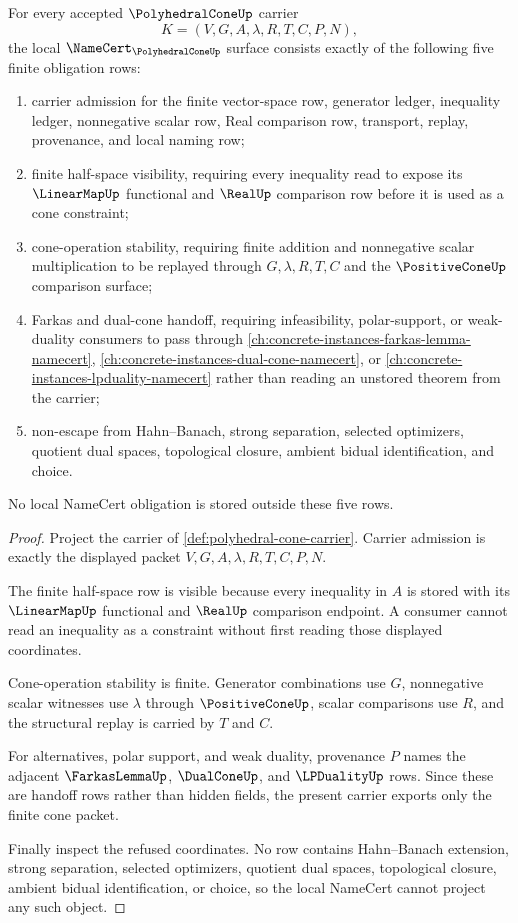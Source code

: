 \begin{theorem}
\label{thm:polyhedral-cone-namecert-obligations}
For every accepted $\PolyhedralConeUp$ carrier
$$
K=(V,G,A,\lambda,R,T,C,P,N),
$$
the local $\NameCert_{\PolyhedralConeUp}$ surface consists exactly of the following five finite obligation rows:
\begin{enumerate}
\item carrier admission for the finite vector-space row, generator ledger, inequality ledger, nonnegative scalar row, Real comparison row, transport, replay, provenance, and local naming row;
\item finite half-space visibility, requiring every inequality read to expose its $\LinearMapUp$ functional and $\RealUp$ comparison row before it is used as a cone constraint;
\item cone-operation stability, requiring finite addition and nonnegative scalar multiplication to be replayed through $G,\lambda,R,T,C$ and the $\PositiveConeUp$ comparison surface;
\item Farkas and dual-cone handoff, requiring infeasibility, polar-support, or weak-duality consumers to pass through \autoref{ch:concrete-instances-farkas-lemma-namecert}, \autoref{ch:concrete-instances-dual-cone-namecert}, or \autoref{ch:concrete-instances-lpduality-namecert} rather than reading an unstored theorem from the carrier;
\item non-escape from Hahn--Banach, strong separation, selected optimizers, quotient dual spaces, topological closure, ambient bidual identification, and choice.
\end{enumerate}
No local NameCert obligation is stored outside these five rows.
\end{theorem}
\begin{proof}
Project the carrier of \autoref{def:polyhedral-cone-carrier}. Carrier admission is exactly the displayed packet $V,G,A,\lambda,R,T,C,P,N$.

The finite half-space row is visible because every inequality in $A$ is stored with its $\LinearMapUp$ functional and $\RealUp$ comparison endpoint. A consumer cannot read an inequality as a constraint without first reading those displayed coordinates.

Cone-operation stability is finite. Generator combinations use $G$, nonnegative scalar witnesses use $\lambda$ through $\PositiveConeUp$, scalar comparisons use $R$, and the structural replay is carried by $T$ and $C$.

For alternatives, polar support, and weak duality, provenance $P$ names the adjacent $\FarkasLemmaUp$, $\DualConeUp$, and $\LPDualityUp$ rows. Since these are handoff rows rather than hidden fields, the present carrier exports only the finite cone packet.

Finally inspect the refused coordinates. No row contains Hahn--Banach extension, strong separation, selected optimizers, quotient dual spaces, topological closure, ambient bidual identification, or choice, so the local NameCert cannot project any such object.
\end{proof}

